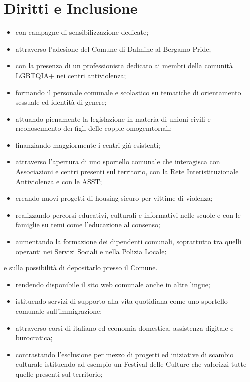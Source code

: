 \section{Diritti e Inclusione}
\begin{itemize}
  \item con campagne di sensibilizzazione dedicate; 
  \item attraverso l'adesione del Comune di Dalmine al Bergamo Pride;
  \item con la presenza di un professionista dedicato ai membri della comunità LGBTQIA+ nei centri antiviolenza;
  \item formando il personale comunale e scolastico su tematiche di orientamento sessuale ed identità di genere;
  \item attuando pienamente la legislazione in materia di unioni civili e riconoscimento dei figli delle coppie omogenitoriali; 
\end{itemize}

\begin{bluebox}
\begin{itemize}
  \item finanziando maggiormente i centri già esistenti;
  \item attraverso l'apertura di uno sportello comunale che interagisca con Associazioni e centri presenti sul territorio, con la Rete Interistituzionale Antiviolenza e con le ASST;
  \item creando nuovi progetti di housing sicuro per vittime di violenza;
  \item realizzando percorsi educativi, culturali e informativi nelle scuole e con le famiglie su temi come l'educazione al consenso;
  \item aumentando la formazione dei dipendenti comunali, soprattutto tra quelli operanti nei Servizi Sociali e nella Polizia Locale;
\end{itemize}
\end{bluebox}

 e sulla possibilità di depositarlo presso il Comune.

\begin{itemize}
  \item rendendo disponibile il sito web comunale anche in altre lingue;
  \item istituendo servizi di supporto alla vita quotidiana come uno sportello comunale sull'immigrazione;
  \item attraverso corsi di italiano ed economia domestica, assistenza digitale e burocratica;
  \item contrastando l'esclusione per mezzo di progetti ed iniziative di scambio culturale istituendo ad esempio un Festival delle Culture che valorizzi tutte quelle presenti sul territorio;
\end{itemize}
